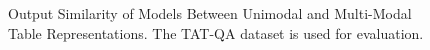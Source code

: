 \begin{figure}[t]
    \centering
    \caption{Output Similarity of Models Between Unimodal and Multi-Modal Table Representations. The TAT-QA dataset is used for evaluation.}
    \label{fig:similarity}
\end{figure}

